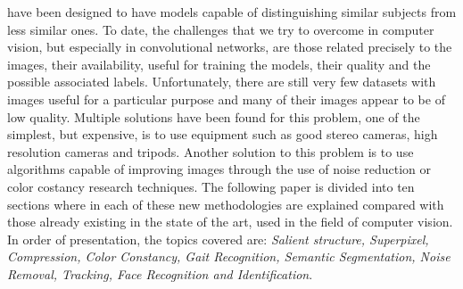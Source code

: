 have been designed to have models capable of distinguishing similar subjects 
from less similar ones. To date, the challenges that we try to overcome in 
computer vision, but especially in convolutional networks, are those related 
precisely to the images, their availability, useful for training the models, their 
quality and the possible associated labels. Unfortunately, there are still very 
few datasets with images useful for a particular purpose and many of their 
images appear to be of low quality. Multiple solutions have been found for 
this problem, one of the simplest, but expensive, is to use equipment such as 
good stereo cameras, high resolution cameras and tripods. Another solution 
to this problem is to use algorithms capable of improving images through the 
use of noise reduction or color costancy research techniques. The following 
paper is divided into ten sections where in each of these new methodologies 
are explained compared with those already existing in the state of the art, 
used in the field of computer vision. In order of presentation, the topics 
covered are: \emph{Salient structure, Superpixel, Compression, Color Constancy, 
Gait Recognition, Semantic Segmentation, Noise Removal, Tracking, Face 
Recognition and Identification}.

